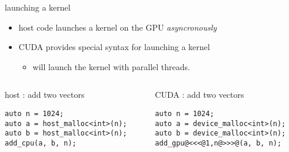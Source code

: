 \begin{frame}[fragile]{}
    \begin{info}{launching a kernel}
    \begin{itemize}
        \item host code launches a kernel on the GPU \emph{asyncronously}
        \item CUDA provides special  syntax for launching a kernel
        \begin{itemize}
            \item {} will launch the kernel  with  parallel threads.
        \end{itemize}
    \end{itemize}
    \end{info}

    \begin{columns}[T]
        \begin{column}{0.5\textwidth}
            \begin{codecolumn}{host : add two vectors}
        \begin{lstlisting}[style=boxcuda]
auto n = 1024;
auto a = host_malloc<int>(n);
auto b = host_malloc<int>(n);
add_cpu(a, b, n);
        \end{lstlisting}
            \end{codecolumn}
        \end{column} \begin{column}{0.5\textwidth}
            \begin{codecolumn}{CUDA : add two vectors}
        \begin{lstlisting}[style=boxcuda]
auto n = 1024;
auto a = device_malloc<int>(n);
auto b = device_malloc<int>(n);
add_gpu@<<<@1,n@>>>@(a, b, n);
        \end{lstlisting}
            \end{codecolumn}
        \end{column}
    \end{columns}

\end{frame}

